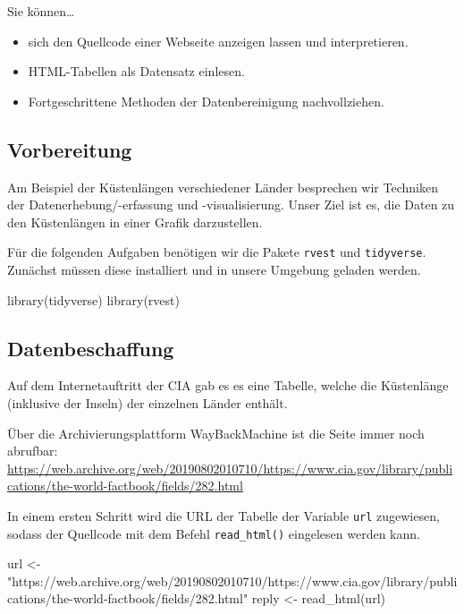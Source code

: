 \documentclass[11pt,german,a4paper]{article}
\newenvironment{Shaded}{\begin{snugshade}}{\end{snugshade}}
\newcommand{\FunctionTok}[1]{\textcolor[rgb]{0.00,0.00,0.00}{#1}}
\newcommand{\NormalTok}[1]{#1}
\newcommand{\OtherTok}[1]{\textcolor[rgb]{0.56,0.35,0.01}{#1}}
\newcommand{\StringTok}[1]{\textcolor[rgb]{0.31,0.60,0.02}{#1}}
\providecommand{\tightlist}{%
  \setlength{\itemsep}{0pt}\setlength{\parskip}{0pt}}
\begin{document}
Sie können\ldots{}

\begin{itemize}
\tightlist
\item
  sich den Quellcode einer Webseite anzeigen lassen und interpretieren.
\item
  HTML-Tabellen als Datensatz einlesen.
\item
  Fortgeschrittene Methoden der Datenbereinigung nachvollziehen.
\end{itemize}

\hypertarget{vorbereitung}{%
\subsection{Vorbereitung}\label{vorbereitung}}

Am Beispiel der Küstenlängen verschiedener Länder besprechen wir Techniken der Datenerhebung/-erfassung und -visualisierung. Unser Ziel ist es, die Daten zu den Küstenlängen in einer Grafik darzustellen.

Für die folgenden Aufgaben benötigen wir die Pakete \texttt{rvest} und \texttt{tidyverse}. Zunächst müssen diese installiert und in unsere Umgebung geladen werden.

\begin{Shaded}
\begin{Highlighting}[]
\FunctionTok{library}\NormalTok{(tidyverse)}
\FunctionTok{library}\NormalTok{(rvest)}
\end{Highlighting}
\end{Shaded}

\hypertarget{datenbeschaffung}{%
\subsection{Datenbeschaffung}\label{datenbeschaffung}}

Auf dem Internetauftritt der CIA gab es es eine Tabelle, welche die Küstenlänge (inklusive der Inseln) der einzelnen Länder enthält.

Über die Archivierungsplattform WayBackMachine ist die Seite immer noch abrufbar: \url{https://web.archive.org/web/20190802010710/https://www.cia.gov/library/publications/the-world-factbook/fields/282.html}

In einem ersten Schritt wird die URL der Tabelle der Variable \texttt{url} zugewiesen, sodass der Quellcode mit dem Befehl \texttt{read\_html()} eingelesen werden kann.

\begin{Shaded}
\begin{Highlighting}[]
\NormalTok{url }\OtherTok{\textless{}{-}} \StringTok{"https://web.archive.org/web/20190802010710/https://www.cia.gov/library/publications/the{-}world{-}factbook/fields/282.html"}
\NormalTok{reply }\OtherTok{\textless{}{-}} \FunctionTok{read\_html}\NormalTok{(url)}
\end{Highlighting}
\end{Shaded}
\end{document}
